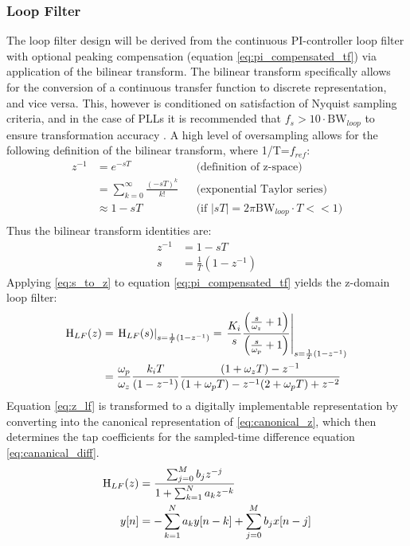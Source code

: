 	\subsubsection{Loop Filter}
		The loop filter design will be derived from the continuous PI-controller loop filter with optional peaking compensation (equation \ref{eq:pi_compensated_tf}) via application of the bilinear transform. The bilinear transform specifically allows for the conversion of a continuous transfer function to discrete representation, and vice versa. This, however is conditioned on satisfaction of Nyquist sampling criteria, and in the case of PLLs it is recommended that $f_s > 10\cdot\mathrm{BW}_{loop}$ to ensure transformation accuracy \cite{gardner_1980}. A high level of oversampling allows for the following definition of the bilinear transform, where 1/T=$f_{ref}$:
		\begin{align*}
			z^{-1} &= e^{-sT} && \text{(definition of z-space)} \\
			&= \sum_{k=0}^\infty\frac{(-sT)^k}{k!} && \text{(exponential Taylor series)} \\
			&\approx 1-sT &&\text{(if $|sT| = 2\pi\mathrm{BW}_{loop}\cdot T << 1$)} \\
		\end{align*}
		Thus the bilinear transform identities are:
		\begin{align}
			z^{-1} &= 1-sT\\
			s &= \frac{1}{T}(1-z^{-1}) \label{eq:s_to_z}
		\end{align}
		Applying \ref{eq:s_to_z} to equation \ref{eq:pi_compensated_tf} yields the z-domain loop filter:
		\begin{align}
			\textnormal{H}_{LF}(z) &= \left.\textnormal{H}_{LF}(s)\right\vert_{s=\frac{1}{T}(1-z^{-1})} = \left.\frac{K_i}{s}\frac{\left(\frac{s}{\omega_z} + 1\right)}{\left(\frac{s}{\omega_p} + 1\right)}\right\vert_{s=\frac{1}{T}(1-z^{-1})}\\
			&= \frac{\omega_p}{\omega_z}\frac{k_iT}{(1-z^{-1})}\frac{(1+\omega_zT)-z^{-1}}{(1+\omega_pT) - z^{-1}(2+\omega_pT) + z^{-2}}\label{eq:z_lf}
		\end{align}
		Equation \ref{eq:z_lf} is transformed to a digitally implementable representation by converting into the canonical representation of \ref{eq:canonical_z}, which then determines the tap coefficients for the sampled-time difference equation \ref{eq:cananical_diff}. 
		\begin{align}
			\textnormal{H}_{LF}(z) &= \frac{\sum_{j=0}^M b_jz^{-j}}{1+\sum_{k=1}^N a_kz^{-k}}\label{eq:canonical_z} \\
			y[n]&= -\sum_{k=1}^N a_ky[n-k] + \sum_{j=0}^M b_jx[n-j] \label{eq:cananical_diff}
		\end{align}
